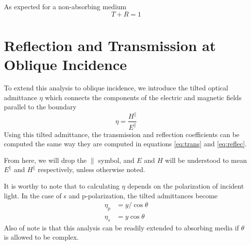 \documentclass{article}
\begin{document}
    As expected for a non-absorbing medium $$ T + R = 1 $$

\section{Reflection and Transmission at Oblique Incidence}
    To extend this analysis to oblique incidence, we introduce the tilted optical admittance $\eta$ which connects the components of the electric and magnetic fields parallel to the boundary
    \begin{equation}
        \eta = \frac{H^{\parallel}}{E^{\parallel}}
    \end{equation}
    Using this tilted admittance, the transmission and reflection coefficients can be computed the same way they are computed in equations \ref{eq:trans} and \ref{eq:reflec}.

    From here, we will drop the $\parallel$ symbol, and $E$ and $H$ will be understood to mean $E^\parallel$ and $H^\parallel$ respectively, unless otherwise noted.

    It is worthy to note that to calculating $\eta$ depends on the polarization of incident light. In the case of s and p-polarization, the tilted admittances become
    \begin{align}
        \eta_p &= y/\cos \theta \\
        \eta_s &= y \cos \theta
    \end{align}
    Also of note is that this analysis can be readily extended to absorbing media if $\theta$ is allowed to be complex.
\end{document}
